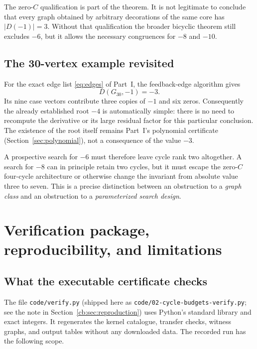 \documentclass[11pt]{article}
\numberwithin{equation}{section}
\theoremstyle{definition}
\begin{document}
The zero-$C$ qualification is part of the theorem. It is not legitimate
to conclude that every graph obtained by arbitrary decorations of the
same core has $|D(-1)|=3$. Without that qualification the broader
bicyclic theorem still excludes $-6$, but it allows the necessary
congruences for $-8$ and $-10$.

\subsection{The 30-vertex example revisited}\label{cb:sec:g30}
For the exact edge list \eqref{eq:edges} of Part~I, the feedback-edge algorithm gives
\[
 D(G_{30},-1)=-3.
\]
Its nine case vectors contribute three copies of $-1$ and six zeros.
Consequently the already established root $-4$ is automatically simple:
there is no need to recompute the derivative or its large residual factor
for this particular conclusion. The existence of the root itself remains
Part~I's polynomial certificate (Section~\ref{sec:polynomial}), not a
consequence of the value $-3$.

A prospective search for $-6$ must therefore leave cycle rank two altogether.
A search for $-8$ can in principle retain two cycles, but it must escape
the zero-$C$ four-cycle architecture or otherwise change the invariant
from absolute value three to seven. This is a precise distinction between
an obstruction to a \emph{graph class} and an obstruction to a
\emph{parameterized search design}.

\section{Verification package, reproducibility, and limitations}\label{cb:sec:verification}

\subsection{What the executable certificate checks}
The file \texttt{code/verify.py} (shipped here as
\texttt{code/02-cycle-budgets-verify.py}; see the note in
Section~\ref{cb:sec:reproduction}) uses Python's standard library and exact
integers. It regenerates the kernel catalogue, transfer checks, witness
graphs, and output tables without any downloaded data. The recorded run
has the following scope.
\end{document}
